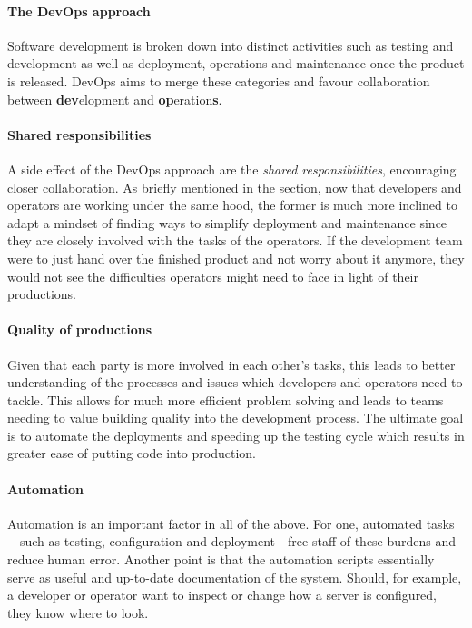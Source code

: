 \paragraph{The DevOps approach}

Software development is broken down into distinct
activities such as testing and development as
well as deployment, operations and maintenance once the product is
released. DevOps aims to merge these categories and favour
collaboration between \textbf{dev}elopment and
\textbf{op}eration\textbf{s}. \cite{devops-culture}

\paragraph{Shared responsibilities}

A side effect of the DevOps approach are the \textit{shared
responsibilities}, encouraging closer collaboration. As briefly
mentioned in the  section, now that
developers and operators are working under the same hood, the former
is much more inclined to adapt a mindset of finding ways to simplify
deployment and maintenance since they are closely involved with the
tasks of the operators. If the development team were to just hand over
the finished product and not worry about it anymore, they would not
see the difficulties operators might need to face in light of their
productions. \cite{devops-culture}

\paragraph{Quality of productions}

Given that each party is more involved in each other's tasks, this
leads to better understanding of the processes and issues which
developers and operators need to tackle. This allows for much more
efficient problem solving and leads to teams needing to value building
quality into the development process. The ultimate goal is to automate the
deployments and speeding up the testing cycle which results in greater
ease of putting code into production. \cite{devops-culture}

\paragraph{Automation}

Automation is an important factor in all of the above. For one,
automated tasks---such as testing, configuration and deployment---free
staff of these burdens and reduce human error. Another point is that
the automation scripts essentially serve as useful and up-to-date
documentation of the system. Should, for example, a developer or
operator want to inspect or change how a server is configured, they
know where to look. \cite{devops-culture}

